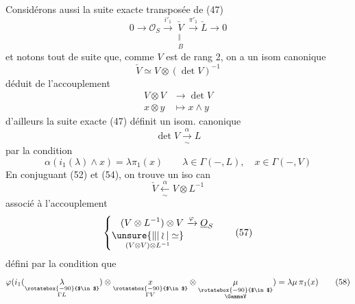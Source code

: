 Considérons aussi la suite exacte transposée de (47)
\[
0\longrightarrow\mathcal O_S\xrightarrow{i'_1}\underset{\substack{\Vert\\ B}}{\check V}\xrightarrow{\pi'_1}\check L\longrightarrow0 \tag*{(51)}
\]
et notons tout de suite que, comme $V$ est
de rang 2, on a un isom canonique
\[
\check V\simeq V\otimes(\det V)^{-1} \tag*{(52)}
\]
déduit de l'accouplement  
\[
\begin{aligned} V\otimes V&\longrightarrow\det V\\ x\otimes y&\longmapsto x\wedge y\end{aligned} \tag*{(53)}
\]
d'ailleurs la suite exacte (47) définit un
isom. canonique
\[
\det V\xrightarrow[\sim]{\alpha}L \tag*{(54)}
\]
 par la condition
\[
\alpha(i_1(\lambda)\wedge x)=\lambda\pi_1(x)\qquad\lambda\in\Gamma(-,L),\quad x\in\Gamma(-,V) \tag*{(55)}
\]
En conjuguant (52) et (54), on trouve un
iso can
\[
\check V\xleftarrow[\sim]{\alpha}V\otimes L^{-1} \tag*{(56)}
\]
 associé à l'accouplement 
\[
\left\{\begin{aligned}
(V\otimes L^{-1})\otimes V&\xrightarrow{\varphi}\underline O_S\\[-2pt]
\underset{(V\otimes V)\otimes L^{-1}}{\unsure{\Vert|\wr|\simeq}}&
\end{aligned}\right. \tag*{(57)}
\]
défini par la condition que
\[
\varphi(i_1(\underset{\substack{\rotatebox{-90}{$\in$}\\\Gamma L}}{\lambda})\otimes\underset{\substack{\rotatebox{-90}{$\in$}\\\Gamma V}}{x}\otimes\underset{\substack{\rotatebox{-90}{$\in$}\\\GammaV}}{\mu})=\lambda\mu\,\pi_1(x) \tag*{(58)}
\]
